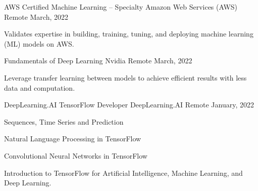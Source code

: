 

\begin{cventries}
  \cventry
  {AWS Certified Machine Learning – Specialty} %
  {Amazon Web Services (AWS)} %
  {Remote} %
  {March, 2022} %
  {
    \begin{cvitems} %
      \item {Validates expertise in building, training, tuning, and deploying machine learning (ML) models on AWS.}
    \end{cvitems}
  } %
  \newline
  \cventry
  {Fundamentals of Deep Learning} %
  {Nvidia} %
  {Remote} %
  {March, 2022} %
  {
    \begin{cvitems} %
      \item {Leverage transfer learning between models to achieve efficient results with less data and computation.}
    \end{cvitems}
  } %
  \newline
  \cventry
  {DeepLearning.AI TensorFlow Developer} %
  {DeepLearning.AI} %
  {Remote} %
  {January, 2022} %
  {
    \begin{cvitems} %
      \item {Sequences, Time Series and Prediction}
      \item {Natural Language Processing in TensorFlow}
      \item {Convolutional Neural Networks in TensorFlow}
      \item {Introduction to TensorFlow for Artificial Intelligence, Machine Learning, and Deep Learning.}
    \end{cvitems}
  }
\end{cventries}